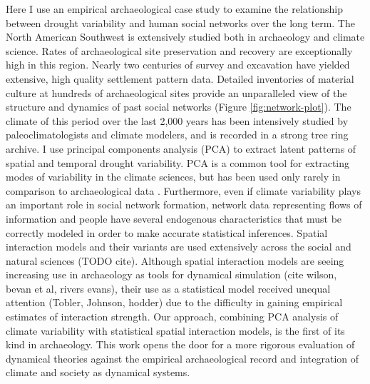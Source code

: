 \documentclass[11pt]{wlscirep}
\begin{document}
Here I use an empirical archaeological case study to examine the relationship between drought variability and human social networks over the long term. The North American Southwest is extensively studied both in archaeology and climate science. Rates of archaeological site preservation and recovery are exceptionally high in this region. Nearly two centuries of survey and excavation have yielded extensive, high quality settlement pattern data. Detailed inventories of material culture at hundreds of archaeological sites provide an unparalleled view of the structure and dynamics of past social networks (Figure \ref{fig:network-plot}). The climate of this period over the last 2,000 years has been intensively studied by paleoclimatologists and climate modelers, and is recorded in a strong tree ring archive. I use principal components analysis (PCA) to extract latent patterns of spatial and temporal drought variability. PCA is a common tool for extracting modes of variability in the climate sciences, but has been used only rarely in comparison to archaeological data \cite{Weiss1982,vanwest}. Furthermore, even if climate variability plays an important role in social network formation, network data representing flows of information and people have several endogenous characteristics that must be correctly modeled in order to make accurate statistical inferences. Spatial interaction models and their variants are used extensively across the social and natural sciences (TODO cite). Although spatial interaction models are seeing increasing use in archaeology as tools for dynamical simulation (cite wilson, bevan et al, rivers evans), their use as a statistical model received unequal attention (Tobler, Johnson, hodder) due to the difficulty in gaining empirical estimates of interaction strength. Our approach, combining PCA analysis of climate variability with statistical spatial interaction models, is the first of its kind in archaeology. This work opens the door for a more rigorous evaluation of dynamical theories against the empirical archaeological record and integration of climate and society as dynamical systems.

\end{document}
